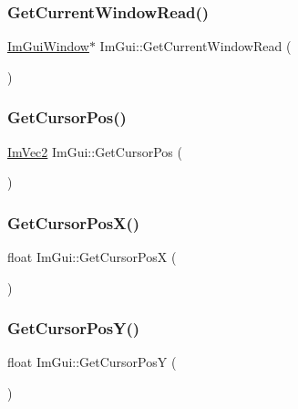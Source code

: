 \subsubsection{\texorpdfstring{Get\+Current\+Window\+Read()}{GetCurrentWindowRead()}}
{\footnotesize\ttfamily \hyperlink{struct_im_gui_window}{Im\+Gui\+Window}$\ast$ Im\+Gui\+::\+Get\+Current\+Window\+Read (\begin{DoxyParamCaption}{ }\end{DoxyParamCaption})}

\hypertarget{namespace_im_gui_a2fa4eb57e0f73b90e8edcd226a0cc7d5}{}\label{namespace_im_gui_a2fa4eb57e0f73b90e8edcd226a0cc7d5} 
\subsubsection{\texorpdfstring{Get\+Cursor\+Pos()}{GetCursorPos()}}
{\footnotesize\ttfamily \hyperlink{struct_im_vec2}{Im\+Vec2} Im\+Gui\+::\+Get\+Cursor\+Pos (\begin{DoxyParamCaption}{ }\end{DoxyParamCaption})}

\hypertarget{namespace_im_gui_a022e32c808ac899e25847f4d65633b77}{}\label{namespace_im_gui_a022e32c808ac899e25847f4d65633b77} 
\subsubsection{\texorpdfstring{Get\+Cursor\+Pos\+X()}{GetCursorPosX()}}
{\footnotesize\ttfamily float Im\+Gui\+::\+Get\+Cursor\+PosX (\begin{DoxyParamCaption}{ }\end{DoxyParamCaption})}

\hypertarget{namespace_im_gui_a86e409551f256b542166989c558d41c1}{}\label{namespace_im_gui_a86e409551f256b542166989c558d41c1} 
\subsubsection{\texorpdfstring{Get\+Cursor\+Pos\+Y()}{GetCursorPosY()}}
{\footnotesize\ttfamily float Im\+Gui\+::\+Get\+Cursor\+PosY (\begin{DoxyParamCaption}{ }\end{DoxyParamCaption})}

